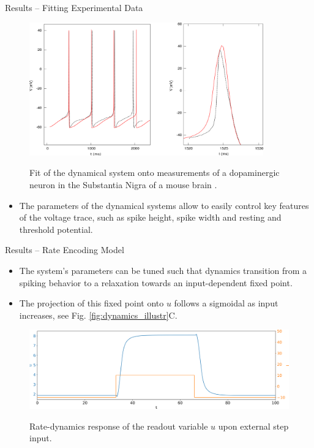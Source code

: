 \documentclass{beamer}
\begin{document}
\begin{frame}[t]
\begin{columns}
\begin{column}{.45\textwidth}
\begin{block}{Results -- Fitting Experimental Data}
\begin{figure}
\includegraphics[width=0.9\textwidth]{../figures/graphics/spikefit.png}
\label{fig:spikefit}
\caption{Fit of the dynamical system onto measurements of a dopaminergic
neuron in the Substantia Nigra of a mouse brain \cite{Bean_2007}.}
\end{figure}
\begin{itemize}
\item The parameters of the dynamical systems allow to easily control key features of the voltage trace, such as spike height, spike width and resting and threshold potential.
\end{itemize}
\end{block}

\begin{block}{Results -- Rate Encoding Model}
\begin{itemize}
\item The system's parameters can be tuned such that dynamics transition from a spiking behavior to a relaxation towards an input-dependent fixed point.
\item The projection of this fixed point onto $u$ follows a sigmoidal as input increases, see Fig. \ref{fig:dynamics_illustr}C. 
\end{itemize}
\begin{figure}
\includegraphics[width=\textwidth]{../figures/graphics/rate_dyn_u_step_illustr.png}
\label{fig:rate_dyn_u_step}
\caption{Rate-dynamics response of the readout variable $u$ upon external step input.}
\end{figure}
\end{block}




\end{column}
\end{columns}
\end{frame}
\end{document}
